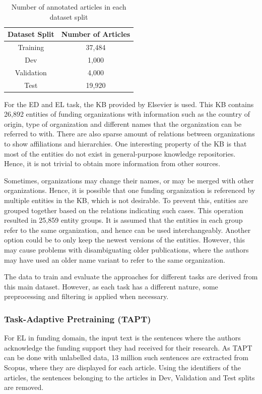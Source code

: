 \documentclass{report}
\theoremstyle{definition}
\theoremstyle{remark}
\begin{document}
\begin{table}[h!]
    \centering
    \begin{tabular}{c c}
    Dataset Split  & Number of Articles  \\
        \hline
    Training &  37,484\\
    Dev & 1,000\\
    Validation & 4,000\\
    Test & 19,920 \\
    \end{tabular}
    \caption{Number of annotated articles in each dataset split}
    \label{tab:goldstats}
\end{table}

For the ED and EL task, the KB provided by Elsevier is used. This KB contains 26,892 entities of funding organizations with information such as the country of origin, type of organization and different names that the organization can be referred to with. There are also sparse amount of relations between organizations to show affiliations and hierarchies. One interesting property of the KB is that most of the entities do not exist in general-purpose knowledge repositories. Hence, it is not trivial to obtain more information from other sources.

Sometimes, organizations may change their names, or may be merged with other organizations. Hence, it is possible that one funding organization is referenced by multiple entities in the KB, which is not desirable. To prevent this, entities are grouped together based on the relations indicating such cases. This operation resulted in 25,859 entity groups. It is assumed that the entities in each group refer to the same organization, and hence can be used interchangeably. Another option could be to only keep the newest versions of the entities. However, this may cause problems with disambiguating older publications, where the authors may have used an older name variant to refer to the same organization.

The data to train and evaluate the approaches for different tasks are derived from this main dataset. However, as each task has a different nature, some preprocessing and filtering is applied when necessary. 
\subsubsection{Task-Adaptive Pretraining (TAPT)}
For EL in funding domain, the input text is the sentences where the authors acknowledge the funding support they had received for their research. As TAPT can be done with unlabelled data, 13 million such sentences are extracted from Scopus, where they are displayed for each article. Using the identifiers of the articles, the sentences belonging to the articles in Dev, Validation and Test splits are removed.
\end{document}
